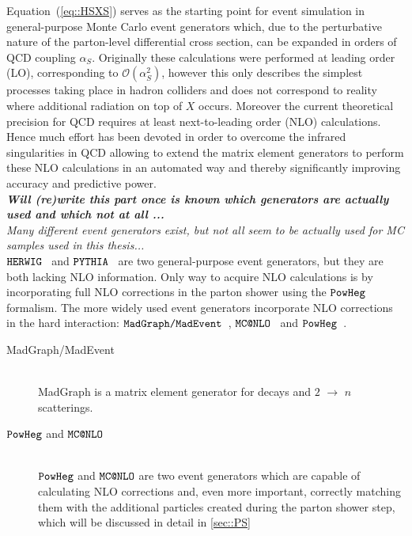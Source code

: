 Equation~(\ref{eq::HSXS}) serves as the starting point for event simulation in general-purpose Monte Carlo event generators which, due to the perturbative nature of the parton-level differential cross section, can be expanded in orders of QCD coupling $\alpha_{S}$. Originally these calculations were performed at leading order (LO), corresponding to $\mathcal{O}(\alpha_{S}^{2})$, however this only describes the simplest processes taking place in hadron colliders and does not correspond to reality where additional radiation on top of $X$ occurs. Moreover the current theoretical precision for QCD requires at least next-to-leading order (NLO) calculations. Hence much effort has been devoted in order to overcome the infrared singularities in QCD allowing to extend the matrix element generators to perform these NLO calculations in an automated way and thereby significantly improving accuracy and predictive power.\\

\textit{\textbf{Will (re)write this part once is known which generators are actually used and which not at all ...\\} Many different event generators exist, but not all seem to be actually used for MC samples used in this thesis...}\\
$\texttt{HERWIG}$~\cite{} and $\texttt{PYTHIA}$~\cite{} are two general-purpose event generators, but they are both lacking NLO information. Only way to acquire NLO calculations is by incorporating full NLO corrections in the parton shower using the $\texttt{PowHeg}$ formalism. 
The more widely used event generators incorporate NLO corrections in the hard interaction: $\texttt{MadGraph/MadEvent}$~\cite{}, $\texttt{MC@NLO}$~\cite{} and $\texttt{PowHeg}$~\cite{}.
\begin{myindentpar}
  \begin{description}
    \item[MadGraph/MadEvent] \hfill \\
      MadGraph is a matrix element generator for decays and $2$ $\rightarrow$ $n$ scatterings. %
    \item[$\texttt{PowHeg}$ and $\texttt{MC@NLO}$] \hfill \\
      $\texttt{PowHeg}$ and $\texttt{MC@NLO}$ are two event generators which are capable of calculating NLO corrections and, even more important, correctly matching them with the additional particles created during the parton shower step, which will be discussed in detail in \ref{sec::PS}
  \end{description}
\end{myindentpar}

